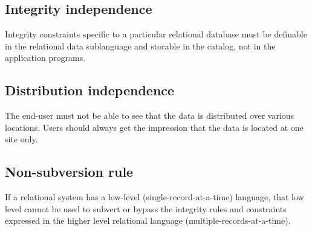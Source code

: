 \subsection{Integrity independence}
  Integrity constraints specific to a particular relational database must be definable in the relational data sublanguage and storable in the catalog, not in the application programs.
  
\subsection{Distribution independence}
  The end-user must not be able to see that the data is distributed over various locations. Users should always get the impression that the data is located at one site only.

\subsection{Non-subversion rule}
  If a relational system has a low-level (single-record-at-a-time) language, that low level cannot be used to subvert or bypass the integrity rules and constraints expressed in the higher level relational language (multiple-records-at-a-time).



